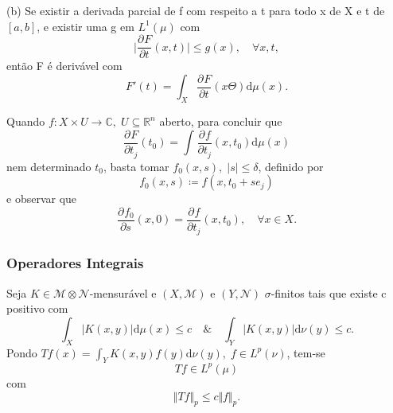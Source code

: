 \documentclass[../distribution_theory_notes.tex]{subfiles}
\begin{document}
(b) Se existir a derivada parcial de f com respeito a t para todo x de X e t de \([a, b]\), e existir uma g em \(L^{1}(\mu )\) com
\[
	\biggl\vert \frac{\partial^{}F}{\partial t^{}}(x, t) \biggr\vert\leq g(x),\quad \forall x, t,
\]
então F é derivável com
\[
	F'(t) = \int_{X}^{}\frac{\partial^{}F}{\partial t^{}}(x \Theta ) \mathrm{d}\mu (x).
\]

\begin{crl*}
	Quando \(f:X \times U\rightarrow \mathbb{C},\; U\subseteq \mathbb{R}^{n}\) aberto, para concluir que
	\[
		\frac{\partial^{}F}{\partial t_{j}^{}}(t_{0}) = \int_{}^{}\frac{\partial^{}f}{\partial t_{j}^{}}(x, t_{0}) \mathrm{d}\mu (x)
	\]
	nem determinado \(t_{0}\), basta tomar \(f_{0}(x, s),\; | s |\leq \delta \), definido por
	\[
		f_{0}(x, s)\coloneqq f(x, t_{0}+se_{j})
	\]
	e observar que
	\[
		\frac{\partial^{}f_{0}}{\partial s^{}}(x, 0) = \frac{\partial^{}f}{\partial t_{j}^{}}(x, t_{0}),\quad \forall x\in X.
	\]
\end{crl*}

\subsubsection{Operadores Integrais}
Seja \(K\in \mathcal{M}\otimes \mathcal{N}\)-mensurável e \((X, \mathcal{M})\) e \((Y, \mathcal{N})\) \(\sigma \)-finitos tais que existe c positivo com
\[
	\int_{X}^{}| K(x, y) | \mathrm{d}\mu (x) \leq c \quad\&\quad \int_{Y}^{}| K(x, y) | \mathrm{d}\nu (y)\leq c.
\]
Pondo \(Tf(x) = \int_{Y}^{}K(x, y)f(y) \mathrm{d}\nu (y),\; f\in L^{p}(\nu )\), tem-se
\[
	Tf\in L^{p}(\mu )
\]
com
\[
	\Vert Tf \Vert_{p}\leq c \Vert f \Vert_{p}.
\]
\end{document}
